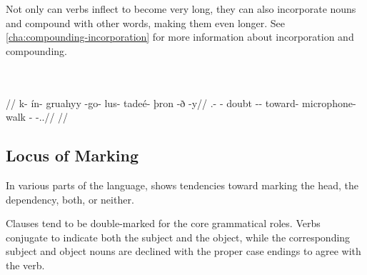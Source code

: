 Not only can verbs inflect to become very long, they can also incorporate nouns and compound with other words, making them even longer. See \autoref{cha:compounding-incorporation} for more information about incorporation and compounding.

	\begingl
		\glpreamble{}\\
		\\
		//
		\gla k- ín- gruahyy -go- lus- tadeé- þron -ð -y//
		\glb \Neg.\Act- \Cond- doubt -\Com- toward- microphone- walk -\Dur{} -\Pt.\Dir.\Sps{}//
		\glft {}//
	\endgl
\xe


\subsection{Locus of Marking}
\label{sec:locus-of-marking}

In various parts of the language, \lang{} shows tendencies toward marking the head, the dependency, both, or neither\autocite{wals-25}.

Clauses tend to be double-marked for the core grammatical roles\autocite{wals-23}. Verbs conjugate to indicate both the subject and the object, while the corresponding subject and object nouns are declined with the proper case endings to agree with the verb.

